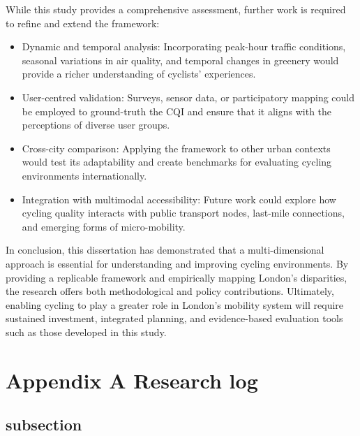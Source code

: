 \documentclass[
  12pt,
  oneside]{book}
\providecommand{\tightlist}{%
  \setlength{\itemsep}{0pt}\setlength{\parskip}{0pt}}
\begin{document}
While this study provides a comprehensive assessment, further work is required to refine and extend the framework:

\begin{itemize}
\tightlist
\item
  Dynamic and temporal analysis: Incorporating peak-hour traffic conditions, seasonal variations in air quality, and temporal changes in greenery would provide a richer understanding of cyclists' experiences.\\
\item
  User-centred validation: Surveys, sensor data, or participatory mapping could be employed to ground-truth the CQI and ensure that it aligns with the perceptions of diverse user groups.\\
\item
  Cross-city comparison: Applying the framework to other urban contexts would test its adaptability and create benchmarks for evaluating cycling environments internationally.\\
\item
  Integration with multimodal accessibility: Future work could explore how cycling quality interacts with public transport nodes, last-mile connections, and emerging forms of micro-mobility.
\end{itemize}

In conclusion, this dissertation has demonstrated that a multi-dimensional approach is essential for understanding and improving cycling environments. By providing a replicable framework and empirically mapping London's disparities, the research offers both methodological and policy contributions. Ultimately, enabling cycling to play a greater role in London's mobility system will require sustained investment, integrated planning, and evidence-based evaluation tools such as those developed in this study.

\printbibliography

\chapter*{Appendix A Research log}\label{appendix-a-research-log}


\section*{subsection}\label{subsection}
\end{document}
